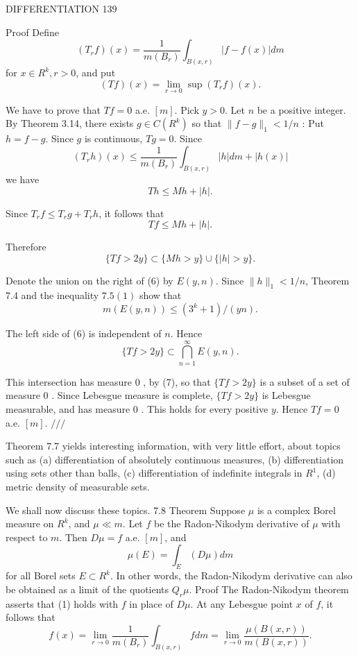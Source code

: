 DIFFERENTIATION 139

Proof Define
$$
\left(T_r f\right)(x)=\frac{1}{m\left(B_r\right)} \int_{B(x, r)}|f-f(x)| d m
$$
for $x \in R^k, r>0$, and put
$$
(T f)(x)=\lim _{r \rightarrow 0} \sup \left(T_r f\right)(x) .
$$

We have to prove that $T f=0$ a.e. $[m]$.
Pick $y>0$. Let $n$ be a positive integer. By Theorem 3.14, there exists $g \in C\left(R^k\right)$ so that $\|f-g\|_1<1 / n$ : Put $h=f-g$.
Since $g$ is continuous, $T g=0$. Since
$$
\left(T_r h\right)(x) \leq \frac{1}{m\left(B_r\right)} \int_{B(x, r)}|h| d m+|h(x)|
$$
we have
$$
T h \leq M h+|h| .
$$

Since $T_r f \leq T_r g+T_r h$, it follows that
$$
T f \leq M h+|h| .
$$

Therefore
$$
\{T f>2 y\} \subset\{M h>y\} \cup\{|h|>y\} .
$$

Denote the union on the right of (6) by $E(y, n)$. Since $\|h\|_1<1 / n$, Theorem 7.4 and the inequality $7.5(1)$ show that
$$
m(E(y, n)) \leq\left(3^k+1\right) /(y n) .
$$

The left side of (6) is independent of $n$. Hence
$$
\{T f>2 y\} \subset \bigcap_{n=1}^{\infty} E(y, n) .
$$

This intersection has measure 0 , by (7), so that $\{T f>2 y\}$ is a subset of a set of measure 0 . Since Lebesgue measure is complete, $\{T f>2 y\}$ is Lebesgue measurable, and has measure 0 . This holds for every positive $y$. Hence $T f=0$ a.e. $[m]$.
$/ / /$

Theorem 7.7 yields interesting information, with very little effort, about topics such as
(a) differentiation of absolutely continuous measures,
(b) differentiation using sets other than balls,
(c) differentiation of indefinite integrals in $R^1$,
(d) metric density of measurable sets.

We shall now discuss these topics.
7.8 Theorem Suppose $\mu$ is a complex Borel measure on $R^k$, and $\mu \ll m$. Let $f$ be the Radon-Nikodym derivative of $\mu$ with respect to $m$. Then $D \mu=f$ a.e. $[m]$, and
$$
\mu(E)=\int_E(D \mu) d m
$$
for all Borel sets $E \subset R^k$.
In other words, the Radon-Nikodym derivative can also be obtained as a limit of the quotients $Q_r \mu$.
Proof The Radon-Nikodym theorem asserts that (1) holds with $f$ in place of $D \mu$. At any Lebesgue point $x$ of $f$, it follows that
$$
f(x)=\lim _{r \rightarrow 0} \frac{1}{m\left(B_r\right)} \int_{B(x, r)} f d m=\lim _{r \rightarrow 0} \frac{\mu(B(x, r))}{m(B(x, r))} .
$$

